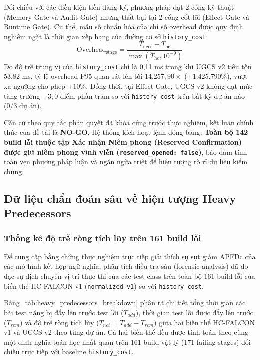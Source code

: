 Đối chiếu với các điều kiện tiền đăng ký, phương pháp đạt 2 cổng kỹ thuật (Memory Gate và Audit Gate) nhưng thất bại tại 2 cổng cốt lõi (Effect Gate và Runtime Gate). Cụ thể, mẫu số chuẩn hóa của chỉ số overhead được quy định nghiêm ngặt là thời gian xếp hạng của đường cơ sở \texttt{history\_cost}:
\begin{equation}
\text{Overhead}_{\text{stage}} = \frac{T_{\text{ugcs}} - T_{\text{hc}}}{\max(T_{\text{hc}}, 10^{-9})}
\end{equation}
Do độ trễ trung vị của \texttt{history\_cost} chỉ là 0,11 ms trong khi UGCS v2 tiêu tốn 53,82 ms, tỷ lệ overhead P95 quan sát lên tới $14.257,90\times$ ($+1.425.790\%$), vượt xa ngưỡng cho phép $+10\%$. Đồng thời, tại Effect Gate, UGCS v2 không đạt mức tăng trưởng $+3,0$ điểm phần trăm so với \texttt{history\_cost} trên bất kỳ dự án nào (0/3 dự án).

Căn cứ theo quy tắc phán quyết đã khóa cứng trước thực nghiệm, kết luận chính thức của đề tài là \textbf{NO-GO}. Hệ thống kích hoạt lệnh đóng băng: \textbf{Toàn bộ 142 build lỗi thuộc tập Xác nhận Niêm phong (Reserved Confirmation) được giữ niêm phong vĩnh viễn (\texttt{reserved\_opened: false})}, bảo đảm tính toàn vẹn phương pháp luận và ngăn ngừa triệt để hiện tượng rò rỉ dữ liệu kiểm chứng.

\subsection{Dữ liệu chẩn đoán sâu về hiện tượng Heavy Predecessors}
\label{subsec:rq3_heavy_predecessors}

\subsubsection{Thống kê độ trễ ròng tích lũy trên 161 build lỗi}
\label{subsubsec:forensic_table}

Để cung cấp bằng chứng thực nghiệm trực tiếp giải thích sự sụt giảm APFDc của các mô hình kết hợp ngữ nghĩa, phân tích điều tra sâu (forensic analysis) đã đo đạc sự dịch chuyển vị trí thực thi của các test class trên toàn bộ 161 build lỗi của biến thể HC-FALCON v1 (\texttt{normalized\_v1}) so với \texttt{history\_cost}.

Bảng~\ref{tab:heavy_predecessors_breakdown} phân rã chi tiết tổng thời gian các bài test nặng bị đẩy lên trước test lỗi ($T_{add}$), thời gian test lỗi được đẩy lên trước ($T_{rem}$) và độ trễ ròng tích lũy ($T_{net} = T_{add} - T_{rem}$) giữa hai biến thể HC-FALCON v1 và UGCS v2 theo từng dự án. Cả hai biến thể đều được tính toán theo cùng một định nghĩa toán học nhất quán trên 161 build vật lý (171 failing stages) đối chiếu trực tiếp với baseline \texttt{history\_cost}.

